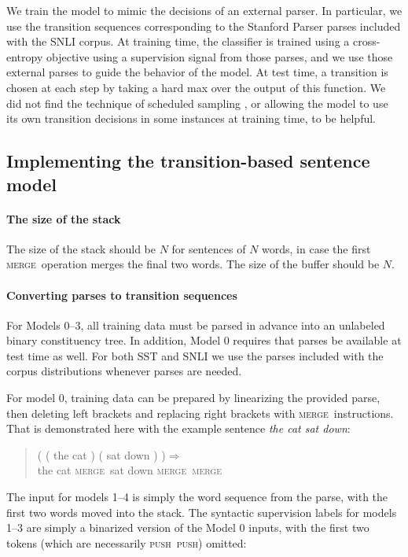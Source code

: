 \documentclass[11pt,letterpaper]{article}
\newcommand{\shift}{\textsc{push}}
\newcommand{\reduce}{\textsc{merge}}
\def\ii#1{\textit{#1}}
\begin{document}
We train the model to mimic the decisions of an external parser. In particular, we use the transition sequences corresponding to the Stanford Parser parses included with the SNLI corpus. At training time, the classifier is trained using a cross-entropy objective using a supervision signal from those parses, and we use those external parses to guide the behavior of the model. At test time, a transition is chosen at each step by taking a hard max over the output of this function. We did not find the technique of scheduled sampling \cite{bengio2015scheduled}, or allowing the model to use its own transition decisions in some instances at training time, to be helpful.

\subsection{Implementing the transition-based sentence model}

\paragraph{The size of the stack}
The size of the stack should be $N$ for sentences of $N$ words, in case the first \reduce~operation merges the final two words. The size of the buffer should be $N$.

\paragraph{Converting parses to transition sequences}

For Models 0--3, all training data must be parsed in advance into an unlabeled binary constituency tree. In addition, Model 0 requires that  parses be available at test time as well. For both SST and SNLI we use the parses included with the corpus distributions whenever parses are needed. 

For model 0, training data can be prepared by linearizing the provided parse, then deleting left brackets and replacing right brackets with \reduce~instructions. That is demonstrated here with the example sentence \ii{the cat sat down}:

\begin{quote}\small
( ( the cat ) ( sat down ) )$\Rightarrow$\\
the cat \reduce~sat down \reduce~\reduce
\end{quote}

The input for models 1--4 is simply the word sequence from the parse, with the first two words moved into the stack. The syntactic supervision labels for models 1--3 are simply a binarized version of the Model 0 inputs, with the first two tokens (which are necessarily \shift~\shift) omitted: 
\end{document}
